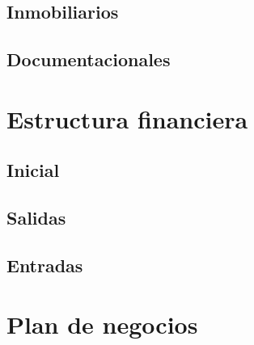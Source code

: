 \documentclass[11pt,spanish,lettersize,twocolumn]{article}
\begin{document}
\subsection{Inmobiliarios}
\subsection{Documentacionales}

\section{Estructura financiera}
\subsection{Inicial}
\subsection{Salidas}
\subsection{Entradas}

\section{Plan de negocios}
\end{document}
